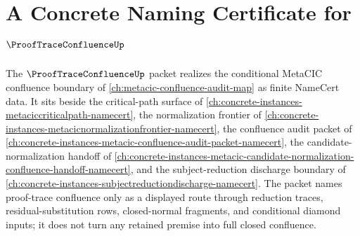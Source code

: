 \chapter{A Concrete Naming Certificate for $\ProofTraceConfluenceUp$}
\label{ch:concrete-instances-proof-trace-confluence-namecert}

The $\ProofTraceConfluenceUp$ packet realizes the conditional MetaCIC confluence boundary of \autoref{ch:metacic-confluence-audit-map} as finite NameCert data. It sits beside the critical-path surface of \autoref{ch:concrete-instances-metaciccriticalpath-namecert}, the normalization frontier of \autoref{ch:concrete-instances-metacicnormalizationfrontier-namecert}, the confluence audit packet of \autoref{ch:concrete-instances-metacic-confluence-audit-packet-namecert}, the candidate-normalization handoff of \autoref{ch:concrete-instances-metacic-candidate-normalization-confluence-handoff-namecert}, and the subject-reduction discharge boundary of \autoref{ch:concrete-instances-subjectreductiondischarge-namecert}. The packet names proof-trace confluence only as a displayed route through reduction traces, residual-substitution rows, closed-normal fragments, and conditional diamond inputs; it does not turn any retained premise into full closed confluence.

